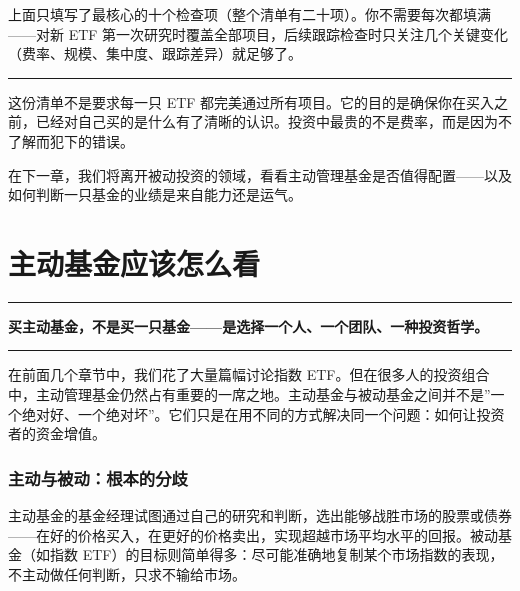 \documentclass[a4paper,11pt,oneside,fontset=none,UTF8,zihao=-4]{ctexbook}
\begin{document}
上面只填写了最核心的十个检查项（整个清单有二十项）。你不需要每次都填满------对新
ETF
第一次研究时覆盖全部项目，后续跟踪检查时只关注几个关键变化（费率、规模、集中度、跟踪差异）就足够了。

\begin{center}{\color{dh-bronze}\rule{0.2\textwidth}{0.5pt}}\end{center}

这份清单不是要求每一只 ETF
都完美通过所有项目。它的目的是确保你在买入之前，已经对自己买的是什么有了清晰的认识。投资中最贵的不是费率，而是因为不了解而犯下的错误。

在下一章，我们将离开被动投资的领域，看看主动管理基金是否值得配置------以及如何判断一只基金的业绩是来自能力还是运气。

\newpage

\chapter{主动基金应该怎么看}\label{ux4e3bux52a8ux57faux91d1ux5e94ux8be5ux600eux4e48ux770b}

\begin{center}{\color{dh-bronze}\rule{0.2\textwidth}{0.5pt}}\end{center}

\begin{dhquote}
\textbf{买主动基金，不是买一只基金------是选择一个人、一个团队、一种投资哲学。}
\end{dhquote}

\begin{center}{\color{dh-bronze}\rule{0.2\textwidth}{0.5pt}}\end{center}

在前面几个章节中，我们花了大量篇幅讨论指数
ETF。但在很多人的投资组合中，主动管理基金仍然占有重要的一席之地。主动基金与被动基金之间并不是''一个绝对好、一个绝对坏''。它们只是在用不同的方式解决同一个问题：如何让投资者的资金增值。

\subsection{主动与被动：根本的分歧}\label{ux4e3bux52a8ux4e0eux88abux52a8ux6839ux672cux7684ux5206ux6b67}

主动基金的基金经理试图通过自己的研究和判断，选出能够战胜市场的股票或债券------在好的价格买入，在更好的价格卖出，实现超越市场平均水平的回报。被动基金（如指数
ETF）的目标则简单得多：尽可能准确地复制某个市场指数的表现，不主动做任何判断，只求不输给市场。
\end{document}
